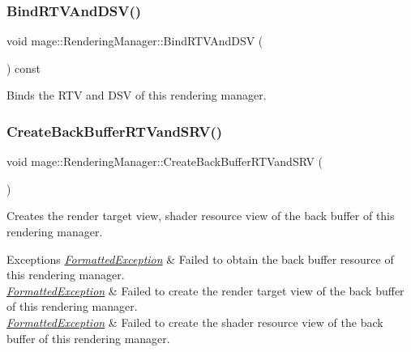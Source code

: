 \subsubsection{\texorpdfstring{Bind\+R\+T\+V\+And\+D\+S\+V()}{BindRTVAndDSV()}}
{\footnotesize\ttfamily void mage\+::\+Rendering\+Manager\+::\+Bind\+R\+T\+V\+And\+D\+SV (\begin{DoxyParamCaption}{ }\end{DoxyParamCaption}) const\hspace{0.3cm}{\ttfamily [noexcept]}}

Binds the R\+TV and D\+SV of this rendering manager. \hypertarget{classmage_1_1_rendering_manager_aced72163a47f3a7faf287b1e6ff8bd3b}{}\label{classmage_1_1_rendering_manager_aced72163a47f3a7faf287b1e6ff8bd3b} 
\subsubsection{\texorpdfstring{Create\+Back\+Buffer\+R\+T\+Vand\+S\+R\+V()}{CreateBackBufferRTVandSRV()}}
{\footnotesize\ttfamily void mage\+::\+Rendering\+Manager\+::\+Create\+Back\+Buffer\+R\+T\+Vand\+S\+RV (\begin{DoxyParamCaption}{ }\end{DoxyParamCaption})\hspace{0.3cm}{\ttfamily [private]}}

Creates the render target view, shader resource view of the back buffer of this rendering manager.


\begin{DoxyExceptions}{Exceptions}
{\em \hyperlink{structmage_1_1_formatted_exception}{Formatted\+Exception}} & Failed to obtain the back buffer resource of this rendering manager. \\
\hline
{\em \hyperlink{structmage_1_1_formatted_exception}{Formatted\+Exception}} & Failed to create the render target view of the back buffer of this rendering manager. \\
\hline
{\em \hyperlink{structmage_1_1_formatted_exception}{Formatted\+Exception}} & Failed to create the shader resource view of the back buffer of this rendering manager. \\
\hline
\end{DoxyExceptions}
\hypertarget{classmage_1_1_rendering_manager_af7266933031efaef98d96dace200220d}{}\label{classmage_1_1_rendering_manager_af7266933031efaef98d96dace200220d} 
